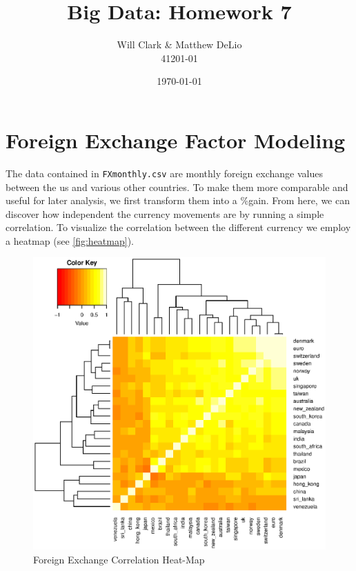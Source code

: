 \documentclass[11pt, fleqn]{article}
\begin{document}
\title{Big Data: Homework 7}
\author{Will Clark \& Matthew DeLio \\ 41201-01}
\date{\today}
\maketitle

\section{Foreign Exchange Factor Modeling} \label{sec:intro}
The data contained in \texttt{FXmonthly.csv} are monthly foreign exchange values between the us and various other countries.  To make them more comparable and useful for later analysis, we first transform them into a \%gain.  From here, we can discover how independent the currency movements are by running a simple correlation.  To visualize the correlation between the different currency we employ a heatmap (see \vref{fig:heatmap}).


\begin{figure}[!htb]
  \centering
  \includegraphics[scale=.7]{heatmap.eps}
  \caption{Foreign Exchange Correlation Heat-Map}
  \label{fig:heatmap}
\end{figure} 
\end{document}
